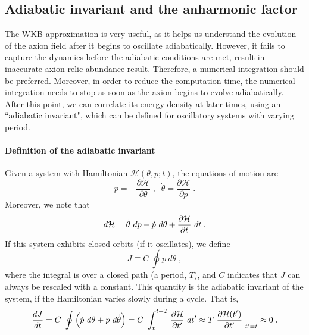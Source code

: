 \documentclass[11pt,a4paper]{article}
\begin{document}
\subsection{Adiabatic invariant and the anharmonic factor}\label{sec:an_fac}
%
The WKB approximation is very useful, as it helps us understand the evolution of the axion field after it begins to oscillate adiabatically. However, it fails to capture the dynamics before the adiabatic conditions are met, result in inaccurate axion relic abundance result. Therefore, a numerical integration should be preferred. Moreover, in order to reduce the computation time, the numerical integration needs to stop as soon as the axion begins to evolve adiabatically. After this point, we can correlate its energy density at later times, using an ``adiabatic invariant", which can be defined  for oscillatory systems with varying period.

\paragraph{Definition of the adiabatic invariant}
%
Given a system with Hamiltonian $\mathcal{H}(\theta,p;t)$, the equations of motion are 
%
\begin{equation}
	\dot p = - \dfrac{\partial \mathcal{H}}{\partial \theta} \;, \;\; 
	\dot \theta =  \dfrac{\partial \mathcal{H}}{\partial p} \;.
	\label{eq:hamiltonian_eoms}
\end{equation}
%
Moreover, we note that
%
\begin{equation}
	d \mathcal{H} = \dot \theta \ d p - \dot p \ d \theta + \dfrac{\partial \mathcal{H}}{\partial t} \ d t \;.  
	\label{eq:total_dH}
\end{equation}
%
If this system exhibits closed orbits (\eg if it oscillates), we define 
%
\begin{equation}
	J \equiv C \ \oint p \ d \theta \;,
	\label{eq:adiabatic_inv_def}
\end{equation}
%
where the integral is over a closed path (\eg a period, $T$), and $C$ indicates that $J$ can always be rescaled with a constant. This quantity is the adiabatic invariant of the system, if the Hamiltonian varies slowly during a cycle. That is,
%
\[
\dfrac{d J}{d t} = C \ \oint \lrBigb{\dot p \ d \theta + p \ d \dot \theta} = C \ \dint_{t}^{t+T}  \dfrac{\partial \Ham}{\partial t^\prime} \ d t^\prime \approx T \ \dfrac{\partial \Ham(t^{\prime})}{\partial t^{\prime}}\Big|_{t^{\prime}=t} \approx 0 
\;. 
\]
%
\end{document}
